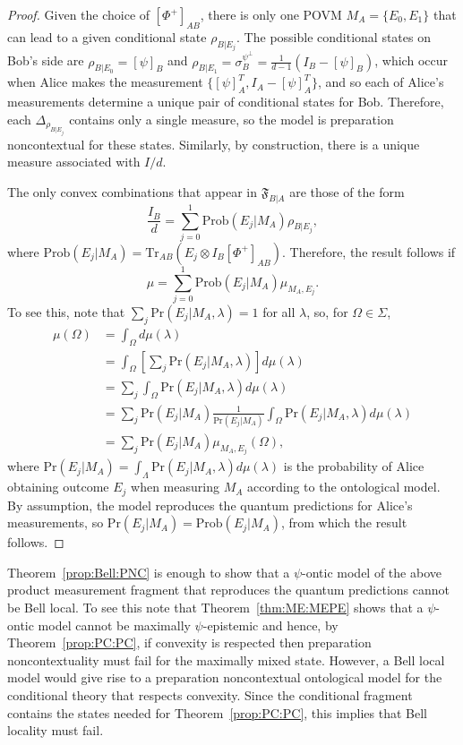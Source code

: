 \documentclass[DIV=calc,fontsize=12pt]{scrartcl} %
\theoremstyle{definition}
\theoremstyle{plain}
\newcommand{\Proj}[1]{\ensuremath{\left [ #1 \right ]}}
\newcommand{\Tr}[2][]{\ensuremath{\text{Tr}_{#1} \left ( #2 \right )}}
\begin{document}
\begin{proof}
Given the choice of $\Proj{\Phi^+}_{AB}$, there is only one POVM
$M_A = \{E_0,E_1\}$ that can lead to a given conditional state
$\rho_{B|E_j}$.  The possible conditional states on Bob's side are
$\rho_{B|E_0} = \Proj{\psi}_B$ and $\rho_{B|E_1} =
\sigma^{\psi^{\perp}}_B = \frac{1}{d-1}(I_B - \Proj{\psi}_B)$, which
occur when Alice makes the measurement $\{\Proj{\psi}^T_A, I_A -
\Proj{\psi}^T_A\}$, and so each of Alice's measurements determine a
unique pair of conditional states for Bob.  Therefore, each
$\Delta_{\rho_{B|E_j}}$ contains only a single measure, so the model
is preparation noncontextual for these states.  Similarly, by
construction, there is a unique measure associated with $I/d$.

The only convex combinations that appear in $\mathfrak{F}_{B|A}$ are
those of the form
\begin{equation}
\frac{I_B}{d} = \sum_{j =0}^1 \text{Prob}(E_j|M_A) \rho_{B|E_j},
\end{equation}
where $\text{Prob}(E_j|M_A) = \Tr[AB]{E_j \otimes I_B
\Proj{\Phi^+}_{AB}}$.  Therefore, the result follows if
\begin{equation}
\mu = \sum_{j=0}^1 \text{Prob}(E_j|M_A) \mu_{M_A,E_j}.
\end{equation}
To see this, note that $\sum_j \text{Pr}(E_j|M_A,\lambda) = 1$ for all
$\lambda$, so, for $\Omega \in \Sigma$,
\begin{align}
\mu(\Omega) & = \int_{\Omega} d\mu(\lambda) \\
& = \int_{\Omega} \left [ \sum_j \text{Pr}(E_j|M_A,\lambda) \right
] d\mu(\lambda) \\
& = \sum_j \int_{\Omega} \text{Pr}(E_j|M_A,\lambda) d\mu(\lambda)
\\
& = \sum_j \text{Pr}(E_j|M_A)
\frac{1}{\text{Pr}(E_j|M_A)} \int_{\Omega}
\text{Pr}(E_j|M_A,\lambda) d\mu(\lambda) \\
& = \sum_j \text{Pr}(E_j|M_A) \mu_{M_A,E_j}(\Omega),
\end{align}
where $\text{Pr}(E_j|M_A) = \int_{\Lambda}
\text{Pr}(E_j|M_A,\lambda)d\mu(\lambda)$ is the probability of Alice
obtaining outcome $E_j$ when measuring $M_A$ according to the
ontological model.  By assumption, the model reproduces the quantum
predictions for Alice's measurements, so $\text{Pr}(E_j|M_A) =
\text{Prob}(E_j|M_A)$, from which the result follows.
\end{proof}

Theorem~\ref{prop:Bell:PNC} is enough to show that a $\psi$-ontic
model of the above product measurement fragment that reproduces the
quantum predictions cannot be Bell local.  To see this note that
Theorem~\ref{thm:ME:MEPE} shows that a $\psi$-ontic model cannot be
maximally $\psi$-epistemic and hence, by Theorem~\ref{prop:PC:PC}, if
convexity is respected then preparation noncontextuality must fail for
the maximally mixed state.  However, a Bell local model would give
rise to a preparation noncontextual ontological model for the
conditional theory that respects convexity.  Since the conditional
fragment contains the states needed for Theorem~\ref{prop:PC:PC}, this
implies that Bell locality must fail.
\end{document}
